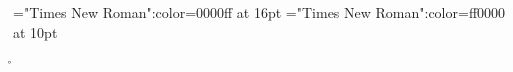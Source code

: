 \font\ba="Times New Roman":color=0000ff at 16pt
\font\a="Times New Roman":color=ff0000 at 10pt
 \r\n
{}




\bye

